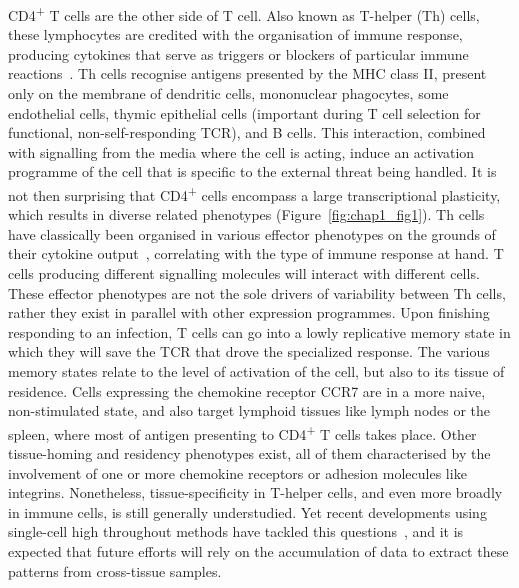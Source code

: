 CD4\textsuperscript{+} T cells are the other side of T cell. Also known as T-helper (Th) cells, these lymphocytes are credited with the organisation of immune response, producing cytokines that serve as triggers or blockers of particular immune reactions~\citep{luckheeram_cd4+t_2012}. Th cells recognise antigens presented by the MHC class II, present only on the membrane of dendritic cells, mononuclear phagocytes, some endothelial cells, thymic epithelial cells (important during T cell selection for functional, non-self-responding TCR), and B cells. This interaction, combined with signalling from the media where the cell is acting, induce an activation programme of the cell that is specific to the external threat being handled. It is not then surprising that CD4\textsuperscript{+} cells encompass a large transcriptional plasticity, which results in diverse related phenotypes (Figure~\ref{fig:chap1_fig1}). Th cells have classically been organised in various effector phenotypes on the grounds of their cytokine output~\citep{mosmann_two_1986,schmitt_regulation_2015}, correlating with the type of immune response at hand. T cells producing different signalling molecules will interact with different cells. These effector phenotypes are not the sole drivers of variability between Th cells, rather they exist in parallel with other expression programmes. Upon finishing responding to an infection, T cells can go into a lowly replicative memory state in which they will save the TCR that drove the specialized response. The various memory states relate to the level of activation of the cell, but also to its tissue of residence. Cells expressing the chemokine receptor CCR7 are in a more naive, non-stimulated state, and also target lymphoid tissues like lymph nodes or the spleen, where most of antigen presenting to CD4\textsuperscript{+} T cells takes place. Other tissue-homing and residency phenotypes exist, all of them characterised by the involvement of one or more chemokine receptors or adhesion molecules like integrins. Nonetheless, tissue-specificity in T-helper cells, and even more broadly in immune cells, is still generally understudied. Yet recent developments using single-cell high throughout methods have tackled this questions~\citep{wong_high-dimensional_2016,scott_transcription_2018}, and it is expected that future efforts will rely on the accumulation of data to extract these patterns from cross-tissue samples.

